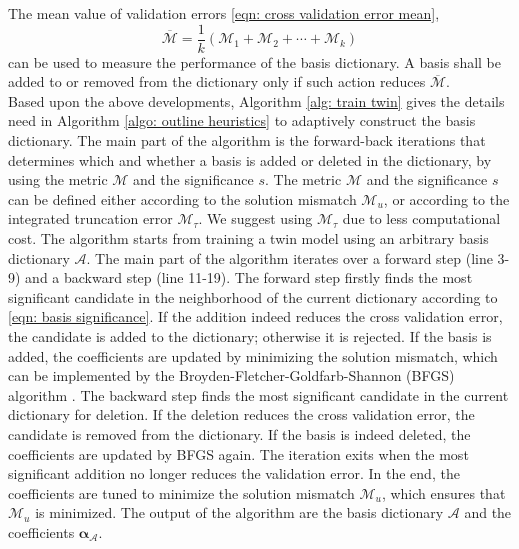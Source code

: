 The mean value of validation errors \eqref{eqn: cross validation error mean},
\begin{equation*}
    \overline{\mathcal{M}} = \frac{1}{k}\left(\mathcal{M}_1 + \mathcal{M}_2 + \cdots 
    + \mathcal{M}_k\right)
\end{equation*}
can be used to measure the performance of the basis dictionary. A basis shall be added to or removed from
the dictionary only if such action reduces $\overline{\mathcal{M}}$.\\

Based upon the above developments, Algorithm \ref{alg: train twin} gives the details need in
Algorithm \ref{algo: outline heuristics} to adaptively construct the basis dictionary.
The main part of the algorithm is the forward-back iterations that
determines which and whether a basis is added or deleted 
in the dictionary, by using the metric $\mathcal{M}$ and the significance $s$.
The metric $\mathcal{M}$ and the significance $s$ can be defined either according to the
solution mismatch $\mathcal{M}_u$, or according to the integrated truncation error
$\mathcal{M}_{\tau}$. We suggest using $\mathcal{M}_{\tau}$ due to less computational cost.
The algorithm starts from training a twin model using 
an arbitrary basis dictionary $\mathcal{A}$. 
The main part of the algorithm iterates over a forward step (line 3-9) and a backward step (line
11-19). The forward step firstly finds the most significant candidate 
in the neighborhood of the current dictionary according to \eqref{eqn: basis significance}.
If the addition indeed reduces the cross validation error, the candidate is added 
to the dictionary; otherwise it is rejected. 
If the basis is added, the coefficients are updated by minimizing the solution mismatch, which can be
implemented by the Broyden-Fletcher-Goldfarb-Shannon (BFGS) algorithm \cite{quasiNewton}.
The backward step finds the most significant
candidate in the current dictionary for deletion. 
If the deletion reduces the cross validation error, the candidate
is removed from the dictionary. 
If the basis is indeed deleted, the coefficients are updated by BFGS again.
The iteration exits when the most significant addition no longer 
reduces the validation error. In the end, the 
coefficients are tuned to minimize the solution mismatch $\mathcal{M}_u$, which ensures that
$\mathcal{M}_u$ is minimized.
The output of the algorithm are the basis dictionary $\mathcal{A}$ and the
coefficients $\boldsymbol{\alpha}_{\mathcal{A}}$.\\



